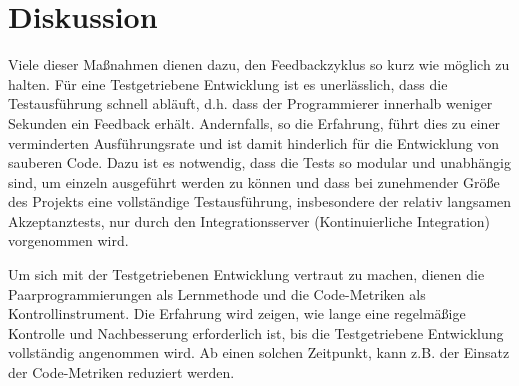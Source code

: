 
\section{Diskussion}

Viele dieser Maßnahmen dienen dazu, den Feedbackzyklus so kurz wie möglich zu halten. Für eine Testgetriebene Entwicklung ist es unerlässlich, dass die Testausführung schnell abläuft, d.h. dass der Programmierer innerhalb weniger Sekunden ein Feedback erhält. Andernfalls, so die Erfahrung, führt dies zu einer verminderten Ausführungsrate und ist damit hinderlich für die Entwicklung von sauberen Code. Dazu ist es notwendig, dass die Tests so modular und unabhängig sind, um einzeln ausgeführt werden zu können und dass bei zunehmender Größe des Projekts eine vollständige Testausführung, insbesondere der relativ langsamen Akzeptanztests, nur durch den Integrationsserver (Kontinuierliche Integration) vorgenommen wird.

Um sich mit der Testgetriebenen Entwicklung vertraut zu machen, dienen die Paarprogrammierungen als Lernmethode und die Code-Metriken als Kontrollinstrument. Die Erfahrung wird zeigen, wie lange eine regelmäßige Kontrolle und Nachbesserung erforderlich ist, bis die Testgetriebene Entwicklung vollständig angenommen wird. Ab einen solchen Zeitpunkt, kann z.B. der Einsatz der Code-Metriken reduziert werden.

